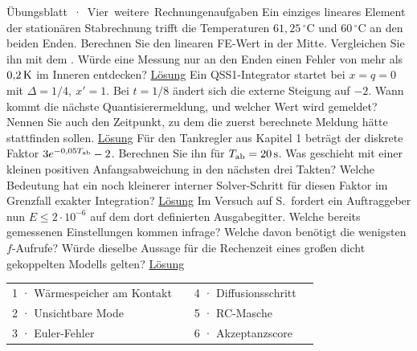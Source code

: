 \unit{Übungsblatt · Vier weitere Rechnungen}{aufgaben}
Ein einziges lineares Element der stationären Stabrechnung trifft die Temperaturen \(61{,}25\,^\circ\mathrm C\) und \(60\,^\circ\mathrm C\) an den beiden Enden. Berechnen Sie den linearen FE-Wert in der Mitte. Vergleichen Sie ihn mit dem . Würde eine Messung nur an den Enden einen Fehler von mehr als \(0{,}2\,\mathrm{K}\) im Inneren entdecken? \hyperlink{loes7}{Lösung}
Ein QSS1-Integrator startet bei \(x=q=0\) mit \(\Delta=1/4,\ x'=1\). Bei \(t=1/8\) ändert sich die externe Steigung auf \(-2\). Wann kommt die nächste Quantisierermeldung, und welcher Wert wird gemeldet? Nennen Sie auch den Zeitpunkt, zu dem die zuerst berechnete Meldung hätte stattfinden sollen. \hyperlink{loes8}{Lösung}
Für den Tankregler aus Kapitel 1 beträgt der diskrete Faktor \(3e^{-0{,}05T_{\rm ab}}-2\). Berechnen Sie ihn für \(T_{\rm ab}=20\,\mathrm{s}\). Was geschieht mit einer kleinen positiven Anfangsabweichung in den nächsten drei Takten? Welche Bedeutung hat ein noch kleinerer interner Solver-Schritt für diesen Faktor im Grenzfall exakter Integration? \hyperlink{loes9}{Lösung}
Im Versuch auf S.\, fordert ein Auftraggeber nun \(E\le2\cdot10^{-6}\) auf dem dort definierten Ausgabegitter. Welche bereits gemessenen Einstellungen kommen infrage? Welche davon benötigt die wenigsten \(f\)-Aufrufe? Würde dieselbe Aussage für die Rechenzeit eines großen dicht gekoppelten Modells gelten? \hyperlink{loes10}{Lösung}
{\tblstart\begin{tabularx}{\linewidth}{@{}YrYr@{}}\toprule
{}&&&\\ · Wärmespeicher am Kontakt&&4 · Diffusionsschritt&\\
2 · Unsichtbare Mode&&5 · RC-Masche&\\
3 · Euler-Fehler&&6 · Akzeptanzscore&\\\bottomrule
\end{tabularx}\par}

